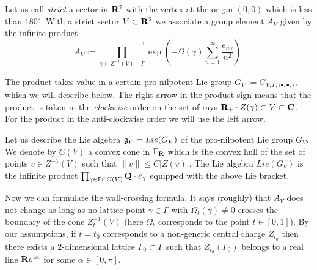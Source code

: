 \documentclass[12pt]{article}
\begin{document}
Let us call {\it strict} a sector in ${\bf R}^2$ with the vertex at the origin $(0,0)$ which is less than $180^\circ$.
With a strict sector  $V\subset {\bf R}^2$ we associate a group element $A_V$ given by the infinite product
$$ A_V:=\prod_{\gamma\in Z^{-1}(V )\cap \Gamma}^{\longrightarrow}
    \exp\left(- \Omega(\gamma)\sum_{n=1}^\infty \frac{e_{n\gamma}}{n^2}\right).$$

The product takes value in a certain pro-nilpotent Lie group $G_V:=G_{V,\Gamma, \langle \bullet,\bullet,\rangle}$, which we will describe below.
The right arrow in the product sign means that the product is taken in the {\it clockwise } order on the set  of rays ${\bf R}_+\cdot Z(\gamma)\subset V\subset {\bf C}$. For the product in the anti-clockwise order
we will use the left arrow.

Let us describe the  Lie algebra ${\mathfrak g}_V=Lie(G_V)$ of the pro-nilpotent Lie group $G_V$.
We denote by $C(V)$ a convex cone in $\Gamma_{{\bf R}}$ which is the convex hull of the set of points $v \in Z^{-1}(V)$ such that $\parallel v \parallel\le C|Z(v)|$. The Lie algebra   $Lie(G_V)$ is the
infinite product $\prod_{\gamma \in \Gamma \cap  C(V)} {\bf Q}\cdot e_\gamma$ equipped with the above Lie bracket.

Now we can  formulate the wall-crossing formula.
It says (roughly) that $A_V$ does not change as long as no lattice point $\gamma\in  \Gamma$
with $\Omega_t(\gamma)\ne 0$ crosses the boundary of the cone $Z^{-1}_t(V)$ (here $\Omega_t$ corresponds to
the point $t\in [0,1]$). By our assumptions, if $t=t_0$ corresponds to a non-generic central charge $Z_{t_0}$ then there exists a $2$-dimensional lattice $\Gamma_0\subset \Gamma$  such that $Z_{t_0}(\Gamma_0)$ belongs to a real line ${{\bf R}}e^{i\alpha}$ for some $\alpha\in [0,\pi]$.
\end{document}
